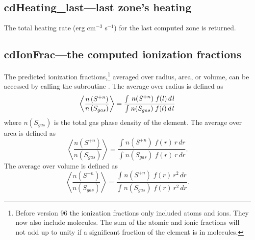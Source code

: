 \subsection{cdHeating\_last---last zone's heating}

The total heating rate (erg cm$^{-3}$ s$^{-1}$)
for the last computed zone is returned.

\subsection{cdIonFrac---the computed ionization fractions}

The predicted ionization fractions,\footnote{Before version 96 the ionization fractions only included atoms and
ions.  They now also include molecules.  The sum of the atomic and ionic
fractions will not add up to unity if a significant fraction of the element
is in molecules.} averaged over radius, area, or volume,
can be accessed by calling the subroutine .
The average over radius is defined as
\begin{equation}
\left\langle {\frac{{n\left( {{S^{ + n}}} \right)}}{{n\left( {{S_{gas}}}
\right)}}} \right\rangle  = \frac{{\int_{}^{} {\,n({S^{ + n}})\;f(l)\,d{\kern
1pt} l} }}{{\int_{}^{} {n({S_{gas}})\;f(l)\,d{\kern 1pt} l} }}
\end{equation}
where $n(S_{gas})$ is the total gas phase density of the element.
The average
over area is defined as
\begin{equation}
\left\langle {\frac{{n\left( {{S^{ + n}}} \right)}}{{n\left( {{S_{gas}}}
\right)}}} \right\rangle  = \frac{{\int_{}^{} {n({S^{ + n}})\;f(r)\,r\,dr}
}}{{\int_{}^{} {n({S_{gas}})\;f(r)\,r\,dr} }}.
\end{equation}
The average
over volume  is defined as
\begin{equation}
\left\langle {\frac{{n\left( {{S^{ + n}}} \right)}}{{n\left( {{S_{gas}}}
\right)}}} \right\rangle  = \frac{{\int_{}^{} {n({S^{ + n}})\;f(r)\,r^2\,dr}
}}{{\int_{}^{} {n({S_{gas}})\;f(r)\,r^2\,dr} }}.
\end{equation}

